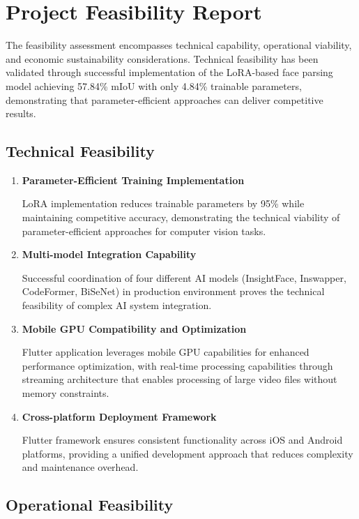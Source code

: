 \documentclass[12pt,a4paper]{report}
\begin{document}
\section{Project Feasibility Report}

The feasibility assessment encompasses technical capability, operational viability, and economic sustainability considerations. Technical feasibility has been validated through successful implementation of the LoRA-based face parsing model achieving 57.84\% mIoU with only 4.84\% trainable parameters, demonstrating that parameter-efficient approaches can deliver competitive results.

\subsection{Technical Feasibility}

\begin{enumerate}[label=\Roman*.]
\item \textbf{Parameter-Efficient Training Implementation}

LoRA implementation reduces trainable parameters by 95\% while maintaining competitive accuracy, demonstrating the technical viability of parameter-efficient approaches for computer vision tasks.

\item \textbf{Multi-model Integration Capability}

Successful coordination of four different AI models (InsightFace, Inswapper, CodeFormer, BiSeNet) in production environment proves the technical feasibility of complex AI system integration.

\item \textbf{Mobile GPU Compatibility and Optimization}

Flutter application leverages mobile GPU capabilities for enhanced performance optimization, with real-time processing capabilities through streaming architecture that enables processing of large video files without memory constraints.

\item \textbf{Cross-platform Deployment Framework}

Flutter framework ensures consistent functionality across iOS and Android platforms, providing a unified development approach that reduces complexity and maintenance overhead.
\end{enumerate}

\subsection{Operational Feasibility}
\end{document}
